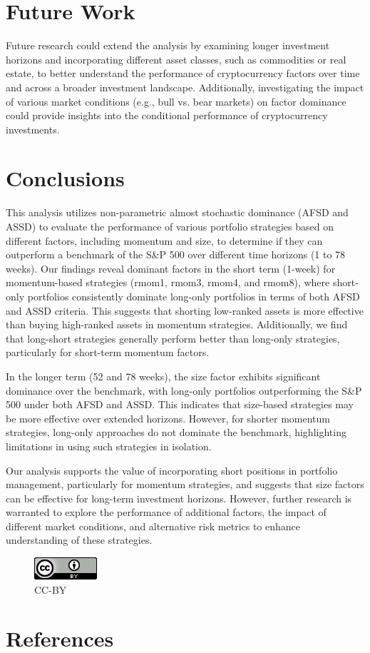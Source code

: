 \documentclass{article}
\begin{document}
\hypertarget{future-work}{%
\section{Future Work}\label{future-work}}

Future research could extend the analysis by examining longer investment horizons and incorporating different asset classes, such as commodities or real estate, to better understand the performance of cryptocurrency factors over time and across a broader investment landscape. Additionally, investigating the impact of various market conditions (e.g., bull vs. bear markets) on factor dominance could provide insights into the conditional performance of cryptocurrency investments.

\hypertarget{conclusions}{%
\section{Conclusions}\label{conclusions}}

This analysis utilizes non-parametric almost stochastic dominance (AFSD and ASSD) to evaluate the performance of various portfolio strategies based on different factors, including momentum and size, to determine if they can outperform a benchmark of the S\&P 500 over different time horizons (1 to 78 weeks). Our findings reveal dominant factors in the short term (1-week) for momentum-based strategies (rmom1, rmom3, rmom4, and rmom8), where short-only portfolios consistently dominate long-only portfolios in terms of both AFSD and ASSD criteria. This suggests that shorting low-ranked assets is more effective than buying high-ranked assets in momentum strategies. Additionally, we find that long-short strategies generally perform better than long-only strategies, particularly for short-term momentum factors.

In the longer term (52 and 78 weeks), the size factor exhibits significant dominance over the benchmark, with long-only portfolios outperforming the S\&P 500 under both AFSD and ASSD. This indicates that size-based strategies may be more effective over extended horizons. However, for shorter momentum strategies, long-only approaches do not dominate the benchmark, highlighting limitations in using such strategies in isolation.

Our analysis supports the value of incorporating short positions in portfolio management, particularly for momentum strategies, and suggests that size factors can be effective for long-term investment horizons. However, further research is warranted to explore the performance of additional factors, the impact of different market conditions, and alternative risk metrics to enhance understanding of these strategies.


\newpage

\begin{figure}
\centering
\includegraphics{cc_by_88x31.png}
\caption{CC-BY}
\end{figure}

\hypertarget{references}{%
\section*{References}\label{references}}
\end{document}
